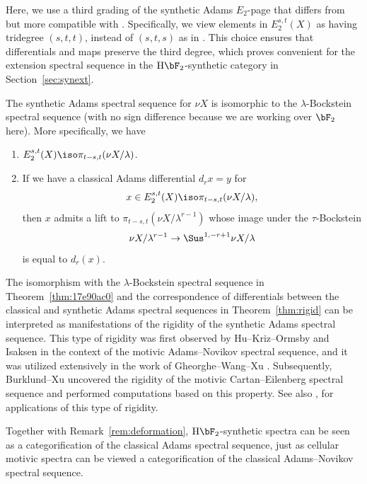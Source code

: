 \documentclass{amsart}
\numberwithin{equation}{section}
\newcommand{\HF}{\mathrm{H}\bF_2}
\begin{document}
\begin{remark}
    Here, we use a third grading of the synthetic Adams $E_2$-page that differs from \cite{BHS} but more compatible with \cite{BurklundIsaksenXu}. Specifically, we view elements in $E_2^{s,t}(X)$ as having tridegree $(s,t,t)$, instead of $(s,t,s)$ as in \cite{BHS}. This choice ensures that differentials and maps preserve the third degree, which proves convenient for the extension spectral sequence in the $\HF$-synthetic category in Section~\ref{sec:synext}.
\end{remark}

\begin{theorem}\label{thm:17e90ac0}
    The synthetic Adams spectral sequence for $\nu X$ is isomorphic to the $\lambda$-Bockstein spectral sequence (with no sign difference because we are working over $\bF_2$ here). More specifically, we have
    \begin{enumerate}
        \item $E_2^{s,t}(X)\iso \pi_{t-s,t}(\nu X /\lambda)$.
        \item If we have a classical Adams differential $d_rx=y$ for 
        $$x\in E_2^{s,t}(X)\iso \pi_{t-s,t}(\nu X /\lambda),$$
        then $x$ admits a lift to $\pi_{t-s,t}(\nu X/\lambda^{r-1})$ whose image under the $\tau$-Bockstein
        $$\nu X/\lambda^{r-1}\to \Sus^{1,-r+1}\nu X/\lambda$$
        is equal to $d_r(x)$.
    \end{enumerate}
\end{theorem}

\begin{remark}
    The isomorphism with the $\lambda$-Bockstein spectral sequence in Theorem~\ref{thm:17e90ac0} and the correspondence of differentials between the classical and synthetic Adams spectral sequences in Theorem~\ref{thm:rigid} can be interpreted as manifestations of the rigidity of the synthetic Adams spectral sequence. This type of rigidity was first observed by Hu--Kriz--Ormsby \cite{HuKrizOrmsby} and Isaksen \cite{Isaksen} in the context of the motivic Adams--Novikov spectral sequence, and it was utilized extensively in the work of Gheorghe--Wang--Xu \cite{GWX}. Subsequently, Burklund--Xu \cite{BurklundXu} uncovered the rigidity of the motivic Cartan--Eilenberg spectral sequence and performed computations based on this property. See also \cite{mmf}, \cite{Burklund} for applications of this type of rigidity.

    Together with Remark~\ref{rem:deformation}, $\HF$-synthetic spectra can be seen as a categorification of the classical Adams spectral sequence, just as cellular motivic spectra can be viewed a categorification of the classical Adams--Novikov spectral sequence.
\end{remark}
\end{document}
